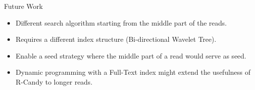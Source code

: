 \documentclass{beamer}
\begin{document}

\begin{frame}{Future Work}
	\begin{itemize}
		\item Different search algorithm starting from the middle part of the reads.
		\item Requires a different index structure (Bi-directional Wavelet Tree).

		\item Enable a seed strategy where the middle part of a read would serve 
			  as seed.
		
		\item Dynamic programming with a Full-Text index might 
			  extend the usefulness of R-Candy to longer reads.

\end{itemize}

\end{frame}

\end{document}
